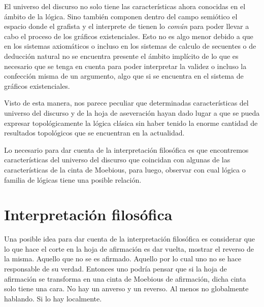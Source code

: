 \documentclass[
	fontsize=10pt, %
	twoside=true, %
	secnumdepth=1, %
	abstract=true, %
]{kaohandt}
\begin{document}
El universo del discurso no solo tiene las características ahora conocidas en el ámbito de la lógica. Sino también componen dentro del campo semiótico el espacio donde el grafista y el interprete de tienen lo \emph{común} para poder llevar a cabo el proceso de los gráficos existenciales. Esto no es algo menor debido a que en los sistemas axiomáticos o incluso en los sistemas de calculo de secuentes o de deducción natural no se encuentra presente el ámbito implícito de lo que es necesario que se tenga en cuenta para poder interpretar la validez o incluso la confección misma de un argumento, algo que si se encuentra en el sistema de gráficos existenciales.

Visto de esta manera, nos parece peculiar que determinadas características del universo del discurso y de la hoja de aseveración hayan dado lugar a que se pueda expresar topológicamente la lógica clásica sin haber tenido la enorme cantidad de resultados topológicos que se encuentran en la actualidad.

Lo necesario para dar cuenta de la interpretación filosófica es que encontremos características del universo del discurso que coincidan con algunas de las características de la cinta de Moebious, para luego, observar con cual lógica o familia de lógicas tiene una posible relación.


\section{Interpretación filosófica} %
\label{sec:Interpretación filosófica}

Una posible idea para dar cuenta de la interpretación filosófica es considerar que lo que hace el corte en la hoja de afirmación es dar vuelta, mostrar el reverso de la misma. Aquello que no se es afirmado. Aquello por lo cual uno no se hace responsable de su verdad. Entonces uno podría pensar que si la hoja de afirmación se transforma en una cinta de Moebious de afirmación, dicha cinta solo tiene una cara. No hay un anverso y un reverso. Al menos no globalmente hablando. Si lo hay localmente.  
\end{document}
